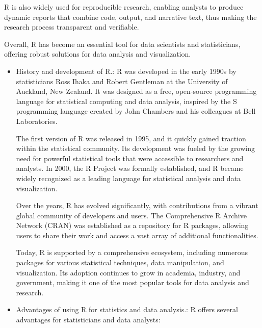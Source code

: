 \documentclass[12pt]{book}
\begin{document}
R is also widely used for reproducible research, enabling analysts to produce dynamic reports that combine code, output, and narrative text, thus making the research process transparent and verifiable. 

Overall, R has become an essential tool for data scientists and statisticians, offering robust solutions for data analysis and visualization.

\begin{itemize}
    \item History and development of R.: R was developed in the early 1990s by statisticians Ross Ihaka and Robert Gentleman at the University of Auckland, New Zealand. It was designed as a free, open-source programming language for statistical computing and data analysis, inspired by the S programming language created by John Chambers and his colleagues at Bell Laboratories.

The first version of R was released in 1995, and it quickly gained traction within the statistical community. Its development was fueled by the growing need for powerful statistical tools that were accessible to researchers and analysts. In 2000, the R Project was formally established, and R became widely recognized as a leading language for statistical analysis and data visualization.

Over the years, R has evolved significantly, with contributions from a vibrant global community of developers and users. The Comprehensive R Archive Network (CRAN) was established as a repository for R packages, allowing users to share their work and access a vast array of additional functionalities.

Today, R is supported by a comprehensive ecosystem, including numerous packages for various statistical techniques, data manipulation, and visualization. Its adoption continues to grow in academia, industry, and government, making it one of the most popular tools for data analysis and research. 

    \item Advantages of using R for statistics and data analysis.: R offers several advantages for statisticians and data analysts:


\end{itemize}
\end{document}
